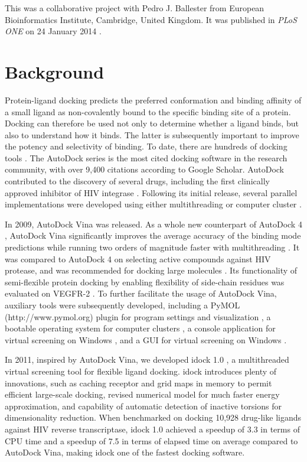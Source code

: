 This was a collaborative project with Pedro J. Ballester from European Bioinformatics Institute, Cambridge, United Kingdom. It was published in \textit{PLoS ONE} on 24 January 2014 \citep{1362}.


\section{Background}

Protein-ligand docking predicts the preferred conformation and binding affinity of a small ligand as non-covalently bound to the specific binding site of a protein. Docking can therefore be used not only to determine whether a ligand binds, but also to understand how it binds. The latter is subsequently important to improve the potency and selectivity of binding. To date, there are hundreds of docking tools \citep{493,922}. The AutoDock series \citep{597,596,595} is the most cited docking software in the research community, with over 9,400 citations according to Google Scholar. AutoDock contributed to the discovery of several drugs, including the first clinically approved inhibitor of HIV integrase \citep{1169}. Following its initial release, several parallel implementations were developed using either multithreading or computer cluster \citep{115,560,782}.

In 2009, AutoDock Vina \citep{595} was released. As a whole new counterpart of AutoDock 4 \citep{596}, AutoDock Vina significantly improves the average accuracy of the binding mode predictions while running two orders of magnitude faster with multithreading \citep{595}. It was compared to AutoDock 4 on selecting active compounds against HIV protease, and was recommended for docking large molecules \citep{556}. Its functionality of semi-flexible protein docking by enabling flexibility of side-chain residues was evaluated on VEGFR-2 \citep{1084}. To further facilitate the usage of AutoDock Vina, auxiliary tools were subsequently developed, including a PyMOL (http://www.pymol.org) plugin for program settings and visualization \citep{609}, a bootable operating system for computer clusters \citep{773}, a console application for virtual screening on Windows \citep{1268}, and a GUI for virtual screening on Windows \citep{1250}.

In 2011, inspired by AutoDock Vina, we developed idock 1.0 \citep{1153}, a multithreaded virtual screening tool for flexible ligand docking. idock introduces plenty of innovations, such as caching receptor and grid maps in memory to permit efficient large-scale docking, revised numerical model for much faster energy approximation, and capability of automatic detection of inactive torsions for dimensionality reduction. When benchmarked on docking 10,928 drug-like ligands against HIV reverse transcriptase, idock 1.0 achieved a speedup of 3.3 in terms of CPU time and a speedup of 7.5 in terms of elapsed time on average compared to AutoDock Vina, making idock one of the fastest docking software.


